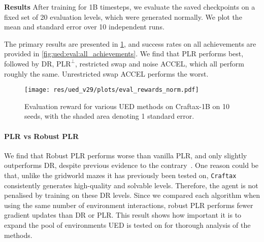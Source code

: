 \documentclass{article}
\theoremstyle{plain}
\theoremstyle{definition}
\theoremstyle{remark}
\begin{document}


\textbf{Results}
After training for 1B timesteps, we evaluate the saved checkpoints on a fixed set of 20 evaluation levels, which were generated normally. We plot the mean and standard error over 10 independent runs.

The primary results are presented in \cref{fig:ued:return}, and success rates on all achievements are provided in \cref{fig:ued:eval:all_achievements}. We find that PLR performs best, followed by DR, $\text{PLR}^\perp$, restricted swap and noise ACCEL, which all perform roughly the same. Unrestricted swap ACCEL performs the worst.





\begin{figure}[H]
        \texttt{[image: res/ued\_v29/plots/eval\_rewards\_norm.pdf]}
        \caption{Evaluation reward for various UED methods on Craftax-1B on 10 seeds, with the shaded area denoting 1 standard error.}
        \label{fig:ued:return}
\end{figure}


\paragraph{PLR vs Robust PLR}
We find that Robust PLR performs worse than vanilla PLR, and only slightly outperforms DR, despite previous evidence to the contrary~\citep{jiang2021Replayguided}. 
One reason could be that, unlike the gridworld mazes it has previously been tested on, \texttt{Craftax} consistently generates high-quality and solvable levels. Therefore, the agent is not penalised by training on these DR levels. Since we compared each algorithm when using the same number of environment interactions, robust PLR performs fewer gradient updates than DR or PLR.
This result shows how important it is to expand the pool of environments UED is tested on for thorough analysis of the methods.
\end{document}

